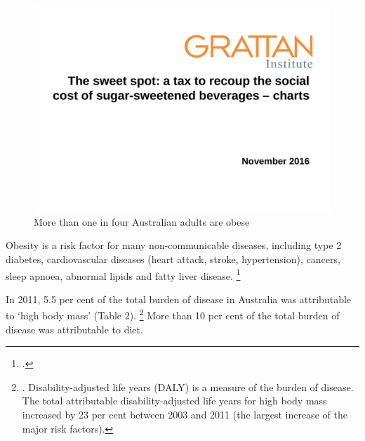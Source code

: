 \documentclass[embargoed]{grattan}
\begin{document}
\begin{figure}
\caption{More than one in four Australian adults are obese}

\includegraphics[page=2]{atlas/ObesityCharts}


\end{figure}

Obesity is a risk factor for many non-communicable diseases, including type 2 diabetes, cardiovascular diseases (heart attack, stroke, hypertension), cancers, sleep apnoea, abnormal lipids and fatty liver disease.%
\footcites[][39--40]{Organisation2000Dietnutritionprevention}{Must1999diseaseburdenassociated}{Collaboration2016Bodymassindex}{Nordstroem2016RisksMyocardialInfarction} 

In 2011, 5.5 per cent of the total burden of disease in Australia was attributable to `high body mass' (Table 2).%
\footnote{\textcite[][Table 6.1]{Health2016AustralianBurdenDisease}.
Disability-adjusted life years (DALY) is a measure of the burden of disease.
The total attributable disability-adjusted life years for high body mass increased by 23 per cent between 2003 and 2011 (the largest increase of the major risk factors).} More than 10 per cent of the total burden of disease was attributable to diet.
\end{document}
